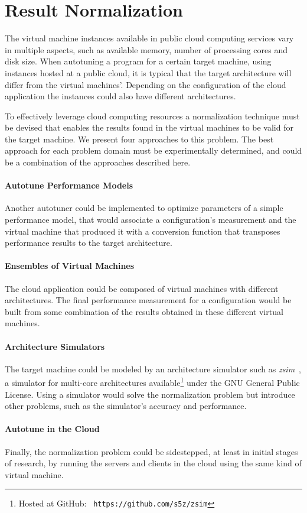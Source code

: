 \section{Result Normalization}
\label{sec:norm}

The virtual machine instances available in public cloud computing services
vary in multiple aspects, such as available memory, number of processing cores
and disk size.
When autotuning a program for a certain target machine, using instances
hosted at a public cloud, it is typical that the target architecture will
differ from the virtual machines'. Depending on the configuration of the
cloud application the instances could also have different architectures.

To effectively leverage cloud computing resources a normalization technique
must be devised that enables the results found in the virtual machines to be
valid for the target machine.  We present four approaches to this problem. The
best approach for each problem domain must be experimentally determined, and
could be a combination of the approaches described here.

\paragraph{Autotune Performance Models}
Another autotuner could be implemented to optimize parameters of a simple
performance model, that would associate a configuration's measurement and the
virtual machine that produced it with a conversion function that transposes
performance results to the target architecture.

\paragraph{Ensembles of Virtual Machines}
The cloud application could be composed of virtual machines with different
architectures. The final performance measurement for a configuration would be
built from some combination of the results obtained in these different virtual
machines.

\paragraph{Architecture Simulators}
The target machine could be modeled by an architecture simulator such as
\emph{zsim}~\cite{sanchez2013zsim}, a simulator for multi-core architectures
available\footnote{Hosted at GitHub: \texttt{\scriptsize
https://github.com/s5z/zsim}} under the GNU General Public License.  Using a
simulator would solve the normalization problem but introduce other problems,
such as the simulator's accuracy and performance.

\paragraph{Autotune in the Cloud}
Finally, the normalization problem could be sidestepped, at least in initial
stages of research, by running the servers and clients in the cloud using
the same kind of virtual machine.
